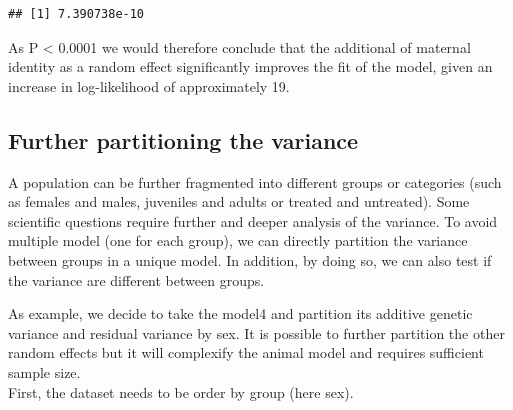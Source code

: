 \documentclass[
  12pt,
]{book}
\newenvironment{Shaded}{\begin{snugshade}}{\end{snugshade}}
\newcommand{\DecValTok}[1]{\textcolor[rgb]{0.00,0.00,0.81}{#1}}
\newcommand{\KeywordTok}[1]{\textcolor[rgb]{0.13,0.29,0.53}{\textbf{#1}}}
\newcommand{\NormalTok}[1]{#1}
\newcommand{\OperatorTok}[1]{\textcolor[rgb]{0.81,0.36,0.00}{\textbf{#1}}}
\newcommand{\StringTok}[1]{\textcolor[rgb]{0.31,0.60,0.02}{#1}}
\begin{document}
\begin{Shaded}
\end{Shaded}

\begin{verbatim}
## [1] 7.390738e-10
\end{verbatim}

As P \textless{} 0.0001 we would therefore conclude that the additional of maternal identity as a random effect significantly improves the fit of the model, given an increase in log-likelihood of approximately 19.

\hypertarget{further-partitioning-the-variance}{%
\subsection{Further partitioning the variance}\label{further-partitioning-the-variance}}

A population can be further fragmented into different groups or categories (such as females and males, juveniles and adults or treated and untreated). Some scientific questions require further and deeper analysis of the variance.
To avoid multiple model (one for each group), we can directly partition the variance between groups in a unique model. In addition, by doing so, we can also test if the variance are different between groups.

As example, we decide to take the model4 and partition its additive genetic variance and residual variance by sex. It is possible to further partition the other random effects but it will complexify the animal model and requires sufficient sample size.\\
First, the dataset needs to be order by group (here sex).
\end{document}

